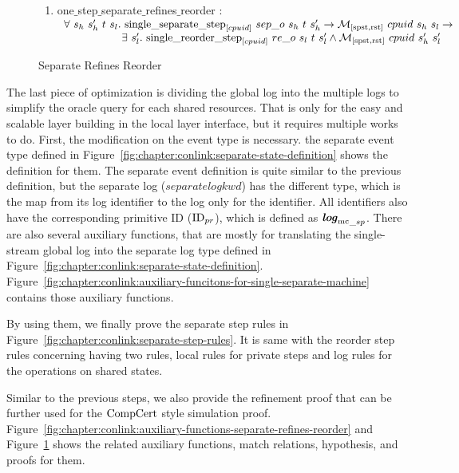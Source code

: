 \begin{figure}
\noindent{}
\begin{enumerate}
\item one$\_$step$\_$separate$\_$refines$\_$reorder : \\
$
\begin{array}{l}
\forall \ s_h \ s_h' \ t \ s_l . \ \singleseparatestep{cpuid}{sep\_o}{s_h}{t}{s_h'} \rightarrow  \matchspstaterstate{cpuid}{s_h}{s_l} \rightarrow \\
\ \ \ \ \ \ \ \ \ \ \ \ \ \ \ \ \exists\ s_l' . \  \singlereorderstep{cpuid}{re\_o}{s_l}{t}{s_l'} \wedge  \matchspstaterstate{cpuid}{s_h'}{s_l'}\\
\end{array}
$
\end{enumerate}
\caption{Separate Refines Reorder}
\label{fig:chapter:conlink:separate-refines-reorder}
\end{figure}
The last piece of optimization is dividing the global log into the multiple logs to simplify the oracle query for each shared resources. 
That is only for the easy and scalable layer building in the local layer interface, 
but it requires multiple works to do. 
First, 
the modification on the event type is necessary. 
the separate event type defined in Figure~\ref{fig:chapter:conlink:separate-state-definition}
shows the definition for them. The separate event definition is quite similar to the previous definition, 
but the separate log ($separatelogkwd$) has the different type,
 which is the map from its log identifier to the log only for the identifier. 
All identifiers also have the corresponding primitive ID (${\mathrm{ID}_{pr}}$), which is defined as ${{\mathrm{\textbf{\textit{log}}}_{\mathrm{mc}}}_{\_sp}}$.
There are also several auxiliary functions, 
that are mostly for translating the single-stream global log into the separate log type defined in Figure~\ref{fig:chapter:conlink:separate-state-definition}.
Figure~\ref{fig:chapter:conlink:auxiliary-funcitons-for-single-separate-machine} contains those auxiliary functions.

By using them, we finally prove the separate step rules in Figure~\ref{fig:chapter:conlink:separate-step-rules}. 
It is same with the reorder step rules concerning
having two rules, local rules for private steps and log rules for the operations on shared states. 

Similar to the previous steps, 
we also provide the refinement proof that can be further used for the $\mathrm{CompCert}$ style simulation proof. 
Figure~\ref{fig:chapter:conlink:auxiliary-functions-separate-refines-reorder} and 
Figure~\ref{fig:chapter:conlink:separate-refines-reorder} shows 
the related auxiliary functions, match relations, hypothesis, and proofs for them.
